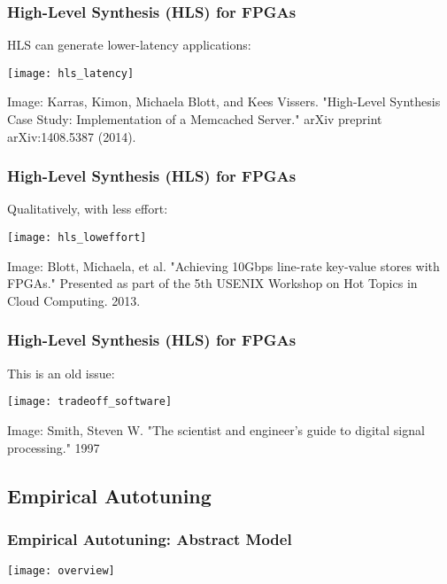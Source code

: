 \documentclass[10pt, compress, aspectratio=169]{beamer}
\begin{document}
\begin{frame}
    \frametitle{High-Level Synthesis (HLS) for FPGAs}
    HLS can generate \alert{lower-latency applications}:
    \begin{center}
        \texttt{[image: hls\_latency]}

        \tiny{Image: Karras, Kimon, Michaela Blott, and Kees Vissers.
        "High-Level Synthesis Case Study: Implementation of a Memcached
        Server." arXiv preprint arXiv:1408.5387 (2014).}
    \end{center}
\end{frame}

\begin{frame}
    \frametitle{High-Level Synthesis (HLS) for FPGAs}
    \alert{Qualitatively}, with \alert{less effort}:
    \begin{center}
        \texttt{[image: hls\_loweffort]}

        \tiny{Image: Blott, Michaela, et al. "Achieving 10Gbps line-rate
        key-value stores with FPGAs." Presented as part of the 5th USENIX
        Workshop on Hot Topics in Cloud Computing. 2013.}
    \end{center}
\end{frame}

\begin{frame}
    \frametitle{High-Level Synthesis (HLS) for FPGAs}
    This is an \alert{old issue}:
    \begin{center}
        \texttt{[image: tradeoff\_software]}

        \tiny{Image: Smith, Steven W. "The scientist and engineer's guide to digital signal processing." 1997}
    \end{center}
\end{frame}

\subsection{Empirical Autotuning}

\begin{frame}
    \frametitle{Empirical Autotuning: Abstract Model}
    \begin{center}
        \texttt{[image: overview]}
    \end{center}
\end{frame}
\end{document}
